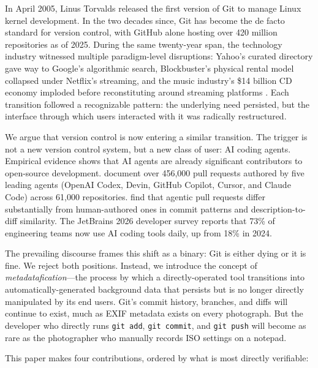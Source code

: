 \documentclass[sigconf, nonacm, anonymous=false]{acmart}
\begin{document}
In April 2005, Linus Torvalds released the first version of Git to manage Linux kernel development. In the two decades since, Git has become the de facto standard for version control, with GitHub alone hosting over 420 million repositories as of 2025. During the same twenty-year span, the technology industry witnessed multiple paradigm-level disruptions: Yahoo's curated directory gave way to Google's algorithmic search, Blockbuster's physical rental model collapsed under Netflix's streaming, and the music industry's \$14 billion CD economy imploded before reconstituting around streaming platforms \citep{mindsetai2026saas}. Each transition followed a recognizable pattern: the underlying need persisted, but the interface through which users interacted with it was radically restructured.

We argue that version control is now entering a similar transition. The trigger is not a new version control system, but a new class of user: AI coding agents. Empirical evidence shows that AI agents are already significant contributors to open-source development. \citet{li2025rise} document over 456,000 pull requests authored by five leading agents (OpenAI Codex, Devin, GitHub Copilot, Cursor, and Claude Code) across 61,000 repositories. \citet{ogenrwot2026how} find that agentic pull requests differ substantially from human-authored ones in commit patterns and description-to-diff similarity. The JetBrains 2026 developer survey reports that 73\% of engineering teams now use AI coding tools daily, up from 18\% in 2024.

The prevailing discourse frames this shift as a binary: Git is either dying or it is fine. We reject both positions. Instead, we introduce the concept of \textit{metadatafication}---the process by which a directly-operated tool transitions into automatically-generated background data that persists but is no longer directly manipulated by its end users. Git's commit history, branches, and diffs will continue to exist, much as EXIF metadata exists on every photograph. But the developer who directly runs \texttt{git add}, \texttt{git commit}, and \texttt{git push} will become as rare as the photographer who manually records ISO settings on a notepad.

This paper makes four contributions, ordered by what is most directly verifiable:
\end{document}
